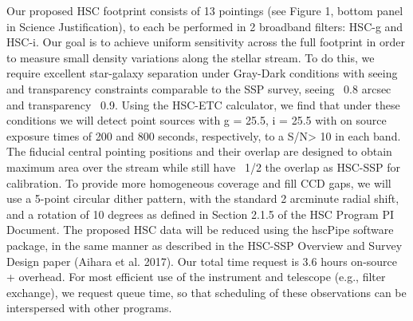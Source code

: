 \documentclass{article}
\begin{document}


\begin{targets}
\targetflag{}
\targetcomment{}
\end{targets}



\begin{technicalinfo}
Our proposed HSC footprint consists of 13 pointings (see Figure 1, bottom panel in Science Justification), to each be performed in 2 broadband filters: HSC-g and HSC-i. Our goal is to achieve uniform sensitivity across the full footprint in order to measure small density variations along the stellar stream. To do this, we require excellent star-galaxy separation under Gray-Dark conditions with seeing and transparency constraints comparable to the SSP survey, seeing ~0.8 arcsec and transparency ~0.9. Using the HSC-ETC calculator, we find that under these conditions we will detect point sources with g = 25.5, i = 25.5 with on source exposure times of 200 and 800 seconds, respectively, to a S/N> 10 in each band. The fiducial central pointing positions and their overlap are designed to obtain maximum area over the stream while still have ~1/2 the overlap as HSC-SSP for calibration. To provide more homogeneous coverage and fill CCD gaps, we will use a 5-point circular dither pattern, with the standard 2 arcminute radial shift, and a rotation of 10 degrees as defined in Section 2.1.5 of the HSC Program PI Document. The proposed HSC data will be reduced using the hscPipe software package, in the same manner as described in the HSC-SSP Overview and Survey Design paper (Aihara et al. 2017). Our total time request is 3.6 hours on-source + overhead. For most efficient use of the instrument and telescope (e.g., filter exchange), we request queue time, so that scheduling of these observations can be interspersed with other programs.
\end{technicalinfo}
\end{document}
